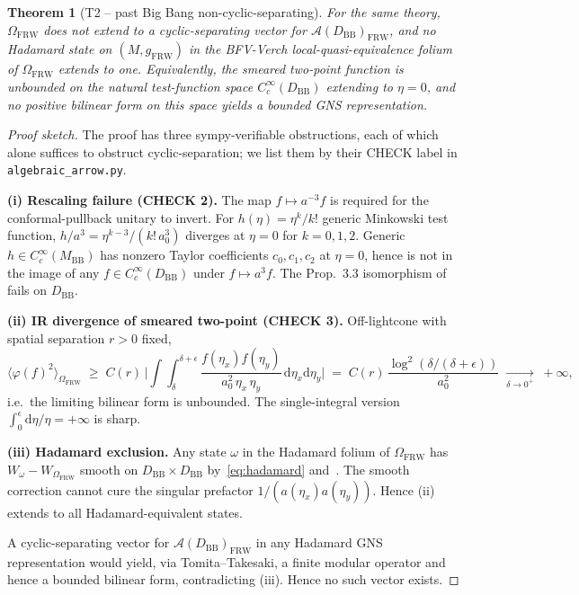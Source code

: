 \documentclass[11pt]{article}
\newtheorem{theorem}{Theorem}
\theoremstyle{definition}
\renewcommand{\AA}{\mathcal{A}}
\newcommand{\FRW}{\mathrm{FRW}}
\newcommand{\BB}{\mathrm{BB}}
\begin{document}
\begin{theorem}[T2 -- past Big Bang non-cyclic-separating]\label{thm:T2-FRW}
For the same theory, $\Omega_\FRW$ does not extend to a cyclic-separating vector for $\AA(D_\BB)_\FRW$, and no Hadamard state on $(M,g_\FRW)$ in the BFV-Verch local-quasi-equivalence folium of $\Omega_\FRW$ extends to one. Equivalently, the smeared two-point function is unbounded on the natural test-function space $C_c^\infty(D_\BB)$ extending to $\eta=0$, and no positive bilinear form on this space yields a bounded GNS representation.
\end{theorem}

\begin{proof}[Proof sketch]
The proof has three sympy-verifiable obstructions, each of which alone suffices to obstruct cyclic-separation; we list them by their CHECK label in \texttt{algebraic\_arrow.py}.

\textbf{(i) Rescaling failure (CHECK 2).} The map $f\mapsto a^{-3}f$ is required for the conformal-pullback unitary to invert. For $h(\eta)=\eta^k/k!$ generic Minkowski test function, $h/a^3 = \eta^{k-3}/(k!\,a_0^3)$ diverges at $\eta=0$ for $k=0,1,2$. Generic $h\in C_c^\infty(M_\BB)$ has nonzero Taylor coefficients $c_0,c_1,c_2$ at $\eta=0$, hence is not in the image of any $f\in C_c^\infty(D_\BB)$ under $f\mapsto a^3 f$. The Prop.~3.3 isomorphism of~\cite{frw_note} fails on $D_\BB$.

\textbf{(ii) IR divergence of smeared two-point (CHECK 3).} Off-lightcone with spatial separation $r>0$ fixed,
\begin{equation*}
\langle\varphi(f)^2\rangle_{\Omega_\FRW}
\;\ge\; C(r)\,\biggl|\!\int\!\!\int_\delta^{\delta+\epsilon} \frac{f(\eta_x)f(\eta_y)}{a_0^2\,\eta_x\,\eta_y}\,\mathrm{d}\eta_x\mathrm{d}\eta_y\biggr|
\;=\; C(r)\,\frac{\log^2(\delta/(\delta+\epsilon))}{a_0^2}\;\xrightarrow[\delta\to 0^+]{}\;+\infty,
\end{equation*}
i.e.\ the limiting bilinear form is unbounded. The single-integral version $\int_0^\epsilon\mathrm{d}\eta/\eta = +\infty$ is sharp.

\textbf{(iii) Hadamard exclusion.} Any state $\omega$ in the Hadamard folium of $\Omega_\FRW$ has $W_\omega - W_{\Omega_\FRW}$ smooth on $D_\BB\times D_\BB$ by~\eqref{eq:hadamard} and~\cite{HollandsWald2001,BrunettiFredenhagenVerch2003}. The smooth correction cannot cure the singular prefactor $1/(a(\eta_x)a(\eta_y))$. Hence (ii) extends to all Hadamard-equivalent states.

A cyclic-separating vector for $\AA(D_\BB)_\FRW$ in any Hadamard GNS representation would yield, via Tomita--Takesaki, a finite modular operator and hence a bounded bilinear form, contradicting (iii). Hence no such vector exists.
\end{proof}
\end{document}
